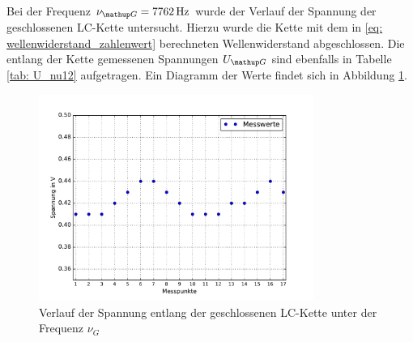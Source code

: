 Bei der Frequenz $\nu\ua{G} = \SI{7762}{\hertz}$ wurde der Verlauf der Spannung der geschlossenen LC-Kette untersucht. Hierzu wurde die Kette
mit dem in \eqref{eq: wellenwiderstand_zahlenwert} berechneten Wellenwiderstand abgeschlossen. Die entlang der Kette gemessenen
Spannungen $U\ua{G}$ sind ebenfalls in Tabelle \ref{tab: U_nu12} aufgetragen. Ein Diagramm der Werte findet sich in Abbildung \ref{fig: U_G}.
\begin{figure}
  \centering
  \includegraphics[width = 0.8\textwidth]{../Messdaten/plots/spannungsverlauf_geschlossen.pdf}
  \caption{Verlauf der Spannung entlang der geschlossenen LC-Kette unter der Frequenz $\nu_G$}
  \label{fig: U_G}
\end{figure}
